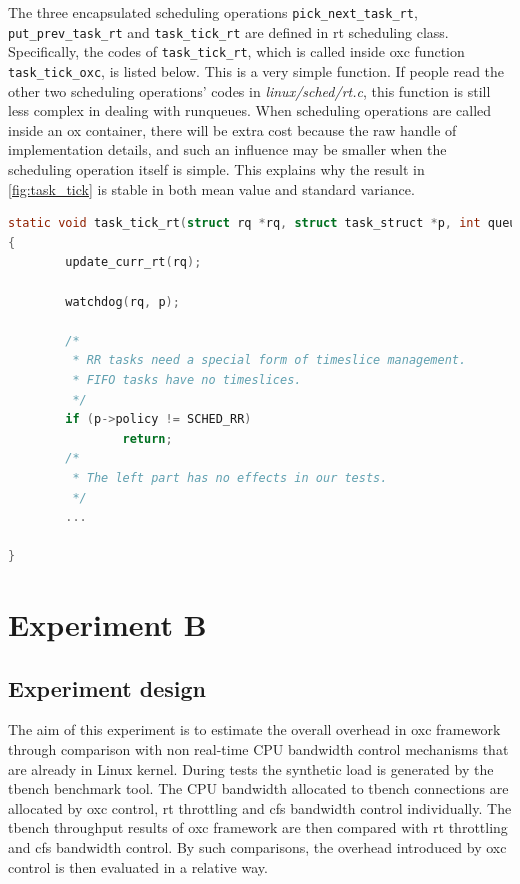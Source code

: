The three encapsulated scheduling operations \texttt{pick\_next\_task\_rt}, 
\\\texttt{put\_prev\_task\_rt} and \texttt{task\_tick\_rt} are defined in
rt scheduling class. Specifically, the codes of \texttt{task\_tick\_rt},
which is called inside oxc function \texttt{task\_tick\_oxc}, is listed 
below. This is a very simple function. If people read the other two
scheduling operations' codes in \emph{linux/sched/rt.c}, this function is 
still less complex in dealing with runqueues. When scheduling operations 
are called inside an ox container, there will be extra cost because
the raw handle of implementation details, and such an influence may 
be smaller when the scheduling operation itself is simple. This explains 
why the result in \ref{fig:task_tick} is stable in both mean value and 
standard variance.
\begin{lstlisting}[language=C,
			caption={\texttt{task\_tick\_rt}},
			label={task_tick_rt}]
static void task_tick_rt(struct rq *rq, struct task_struct *p, int queued)
{
        update_curr_rt(rq);

        watchdog(rq, p);

        /*
         * RR tasks need a special form of timeslice management.
         * FIFO tasks have no timeslices.
         */
        if (p->policy != SCHED_RR)
                return;
        /*
         * The left part has no effects in our tests.
         */
        ...

}
\end{lstlisting}



\section{Experiment B}
\subsection{Experiment design}
The aim of this experiment is to estimate the overall overhead in oxc 
framework through comparison with non real-time CPU bandwidth control 
mechanisms that are already in Linux kernel. During tests the synthetic 
load is generated by the tbench benchmark tool. The CPU bandwidth 
allocated to tbench connections are allocated by oxc control, rt 
throttling and cfs bandwidth control individually. The tbench throughput 
results of oxc framework are then compared with rt throttling and cfs 
bandwidth control. By such comparisons, the overhead introduced by oxc 
control is then evaluated in a relative way.

